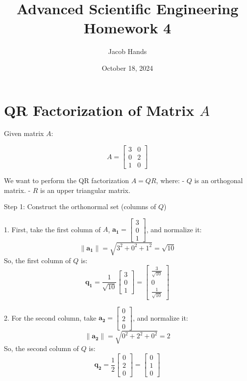 \documentclass[11pt]{article}
\title{Advanced Scientific Engineering \\ Homework 4}
\author{Jacob Hands}
\date{October 18, 2024}
\begin{document}
\maketitle


\section{QR Factorization of Matrix \(A\)}

Given matrix \( A \):

\[
A = \begin{bmatrix} 
3 & 0 \\
0 & 2 \\
1 & 0
\end{bmatrix}
\]

We want to perform the QR factorization \( A = QR \), where:
- \( Q \) is an orthogonal matrix.
- \( R \) is an upper triangular matrix.

Step 1: Construct the orthonormal set (columns of \(Q\))

1. First, take the first column of \( A \), \( \mathbf{a_1} = \begin{bmatrix} 3 \\ 0 \\ 1 \end{bmatrix} \), and normalize it:
   \[
   \|\mathbf{a_1}\| = \sqrt{3^2 + 0^2 + 1^2} = \sqrt{10}
   \]
   So, the first column of \(Q\) is:
   \[
   \mathbf{q_1} = \frac{1}{\sqrt{10}} \begin{bmatrix} 3 \\ 0 \\ 1 \end{bmatrix} = \begin{bmatrix} \frac{3}{\sqrt{10}} \\ 0 \\ \frac{1}{\sqrt{10}} \end{bmatrix}
   \]

2. For the second column, take \( \mathbf{a_2} = \begin{bmatrix} 0 \\ 2 \\ 0 \end{bmatrix} \), and normalize it:
   \[
   \|\mathbf{a_2}\| = \sqrt{0^2 + 2^2 + 0^2} = 2
   \]
   So, the second column of \( Q \) is:
   \[
   \mathbf{q_2} = \frac{1}{2} \begin{bmatrix} 0 \\ 2 \\ 0 \end{bmatrix} = \begin{bmatrix} 0 \\ 1 \\ 0 \end{bmatrix}
   \]
\end{document}
